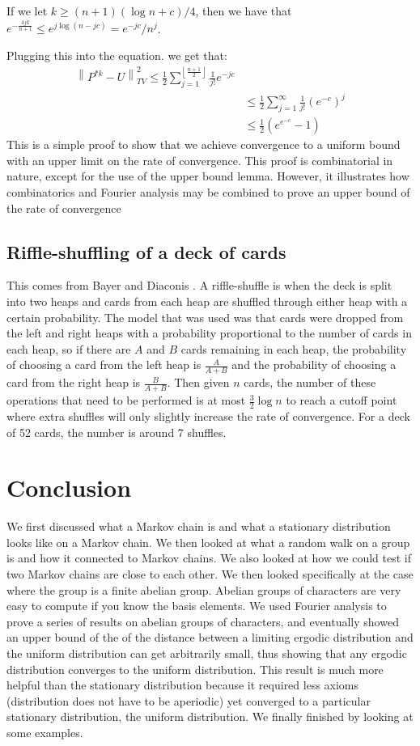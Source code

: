 \documentclass[]{article}
\theoremstyle{definition}
\numberwithin{theorem}{section}
\numberwithin{equation}{section}
\begin{document}
If we let $k \geq (n + 1)(\log n + c)/4$, then we have that $e^{-\frac{4jk}{n+1}} \leq e^{j \log (n - jc)}= e^{- j c}/ n^j$.

Plugging this into the equation. we get that:
\begin{align*}
	\left\| P^{\ast k} - U \right\|_{TV}^2 \leq \frac{1}{2} \sum_{j = 1}^{\left\lfloor \frac{n + 1}{2} \right\rfloor}\frac{1}{j!}e^{-jc}\\
	&\leq \frac{1}{2}\sum_{j = 1}^{\infty}\frac{1}{j!}\left(e^{-c}\right)^j\\
	&\leq \frac{1}{2}\left(e^{e^{-c}} - 1\right)
\end{align*}
This is a simple proof to show that we achieve convergence to a uniform bound with an upper limit on the rate of convergence. This proof is combinatorial in nature, except for the use of the upper bound lemma. However, it illustrates how combinatorics and Fourier analysis may be combined to prove an upper bound of the rate of convergence

	\subsection{Riffle-shuffling of a deck of cards}This comes from Bayer and Diaconis \cite{bayerTrailingDovetailShuffle1992}. A riffle-shuffle is when the deck is split into two heaps and cards from each heap are shuffled through either heap with a certain probability. The model that was used was that cards were dropped from the left and right heaps with a probability proportional to the number of cards in each heap, so if there are $A$ and $B$ cards remaining in each heap, the probability of choosing a card from the left heap is $\frac{A}{A + B}$ and the probability of choosing a card from the right heap is $\frac{B}{A + B}$. Then given $n$ cards, the number of these operations that need to be performed is at most $\frac{3}{2} \log n$ to reach a cutoff point where extra shuffles will only slightly increase the rate of convergence. For a deck of 52 cards, the number is around 7 shuffles. 
\section{Conclusion}
We first discussed what a Markov chain is and what a stationary distribution looks like on a Markov chain. We then looked at what a random walk on a group is and how it connected to Markov chains. We also looked at how we could test if two Markov chains are close to each other. We then looked specifically at the case where the group is a finite abelian group. Abelian groups of characters are very easy to compute if you know the basis elements. We used Fourier analysis to prove a series of results on abelian groups of characters, and eventually showed an upper bound of the of the distance between a limiting ergodic distribution and the uniform distribution can get arbitrarily small, thus showing that any ergodic distribution converges to the uniform distribution. This result is much more helpful than the stationary distribution because it required less axioms (distribution does not have to be aperiodic) yet converged to a particular stationary distribution, the uniform distribution. We finally finished by looking at some examples. 

\printbibliography
\end{document}
